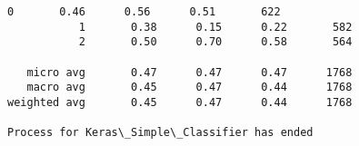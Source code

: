 \documentclass[11pt]{article}
\begin{document}
\begin{Verbatim}[commandchars=\\\{\}]
           0       0.46      0.56      0.51       622
           1       0.38      0.15      0.22       582
           2       0.50      0.70      0.58       564

   micro avg       0.47      0.47      0.47      1768
   macro avg       0.45      0.47      0.44      1768
weighted avg       0.45      0.47      0.44      1768

Process for Keras\_Simple\_Classifier has ended

    \end{Verbatim}


    
    
    
    
\end{document}
